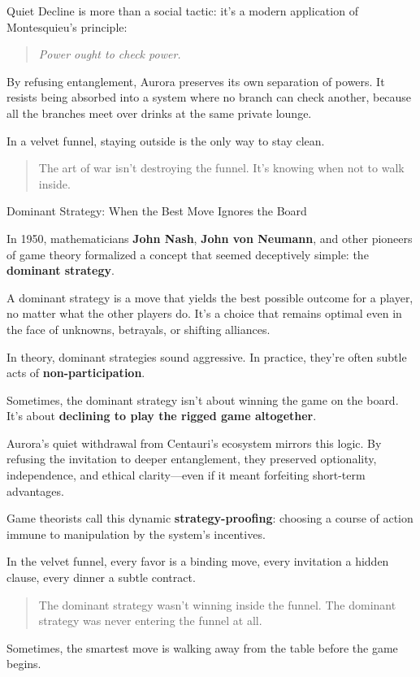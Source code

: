 Quiet Decline is more than a social tactic: it’s a modern application of Montesquieu’s principle:

\begin{quote}
\textit{Power ought to check power.}
\end{quote}

By refusing entanglement, Aurora preserves its own separation of powers. It resists being absorbed into a system where no branch can check another, because all the branches meet over drinks at the same private lounge.

In a velvet funnel, staying outside is the only way to stay clean.

\begin{quote}
  The art of war isn’t destroying the funnel.  It’s knowing when not to walk inside.
\end{quote}


\begin{HistoricalSidebar}{Dominant Strategy: When the Best Move Ignores the Board}

  In 1950, mathematicians \textbf{John Nash}, \textbf{John von Neumann}, and other pioneers of game theory formalized a concept that seemed deceptively simple: the \textbf{dominant strategy}.  

  \medskip
  
  A dominant strategy is a move that yields the best possible outcome for a player, no matter what the other players do. It’s a choice that remains optimal even in the face of unknowns, betrayals, or shifting alliances.
  
  \medskip
  
  In theory, dominant strategies sound aggressive. In practice, they’re often subtle acts of \textbf{non-participation}.  

  \medskip
  
  Sometimes, the dominant strategy isn’t about winning the game on the board. It’s about \textbf{declining to play the rigged game altogether}.  
  
  \medskip
  
  Aurora’s quiet withdrawal from Centauri’s ecosystem mirrors this logic. By refusing the invitation to deeper entanglement, they preserved optionality, independence, and ethical clarity—even if it meant forfeiting short-term advantages.
  
  \medskip
  
  Game theorists call this dynamic \textbf{strategy-proofing}: choosing a course of action immune to manipulation by the system’s incentives.
  
  \medskip
  
  In the velvet funnel, every favor is a binding move, every invitation a hidden clause, every dinner a subtle contract.
  
  \begin{quote}
  The dominant strategy wasn’t winning inside the funnel.  
  The dominant strategy was never entering the funnel at all.
  \end{quote}
  
  Sometimes, the smartest move is walking away from the table before the game begins.
  
\end{HistoricalSidebar}
